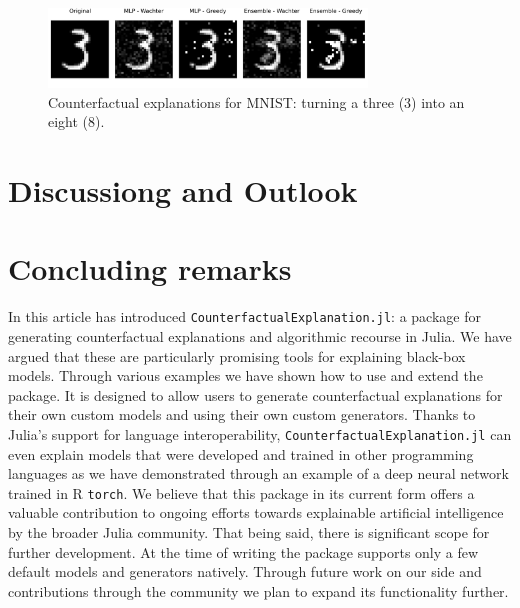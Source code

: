\documentclass{juliacon}
\begin{document}
\begin{figure}

{\centering \includegraphics[width=3.33333in,height=0.83333in]{www/mnist_3_to_8.png}

}

\caption{\label{fig-mnist-3to8}Counterfactual explanations for MNIST:
turning a three (3) into an eight (8).}

\end{figure}

\hypertarget{discussiong-and-outlook}{%
\section{Discussiong and Outlook}\label{discussiong-and-outlook}}

\hypertarget{sec-conclude}{%
\section{Concluding remarks}\label{sec-conclude}}

In this article has introduced \texttt{CounterfactualExplanation.jl}: a
package for generating counterfactual explanations and algorithmic
recourse in Julia. We have argued that these are particularly promising
tools for explaining black-box models. Through various examples we have
shown how to use and extend the package. It is designed to allow users
to generate counterfactual explanations for their own custom models and
using their own custom generators. Thanks to Julia's support for
language interoperability, \texttt{CounterfactualExplanation.jl} can
even explain models that were developed and trained in other programming
languages as we have demonstrated through an example of a deep neural
network trained in R \texttt{torch}. We believe that this package in its
current form offers a valuable contribution to ongoing efforts towards
explainable artificial intelligence by the broader Julia community. That
being said, there is significant scope for further development. At the
time of writing the package supports only a few default models and
generators natively. Through future work on our side and contributions
through the community we plan to expand its functionality further.


\end{document}
